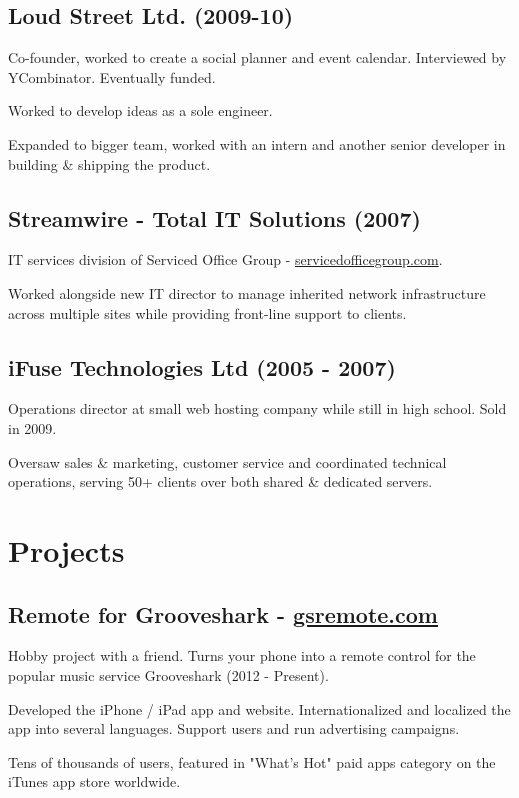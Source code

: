 \documentclass[a4paper]{article}
\renewenvironment{itemize}{
  \begin{list}{}{
    \setlength{\leftmargin}{1.5em}
  }
}{
  \end{list}
}
\begin{document}
\subsection*{Loud Street Ltd. (2009-10)}
\begin{itemize}
  \item Co-founder, worked to create a social planner and event calendar. Interviewed by YCombinator. Eventually funded.
  \item Worked to develop ideas as a sole engineer.
  \item Expanded to bigger team, worked with an intern and another senior developer in building \& shipping the product.
\end{itemize}

\subsection*{Streamwire - Total IT Solutions (2007)}
\begin{itemize}
  \item IT services division of Serviced Office Group - \href{http://servicedofficegroup.com}{servicedofficegroup.com}.
  \item Worked alongside new IT director to manage inherited network infrastructure across multiple sites while providing front-line support to clients.
\end{itemize}

\subsection*{iFuse Technologies Ltd (2005 - 2007)}
\begin{itemize}
  \item Operations director at small web hosting company while still in high school. Sold in 2009.
  \item Oversaw sales \& marketing, customer service and coordinated technical operations, serving 50+ clients over both shared \& dedicated servers.
\end{itemize}

\section*{Projects}

\subsection*{Remote for Grooveshark - \href{http://gsremote.com}{gsremote.com}}
\begin{itemize}
\item Hobby project with a friend. Turns your phone into a remote control for the popular music service Grooveshark (2012 - Present).
\item Developed the iPhone / iPad app and website. Internationalized and localized the app into several languages. Support users and run advertising campaigns.
\item Tens of thousands of users, featured in "What's Hot" paid apps category on the iTunes app store worldwide.
\end{itemize}
\end{document}
